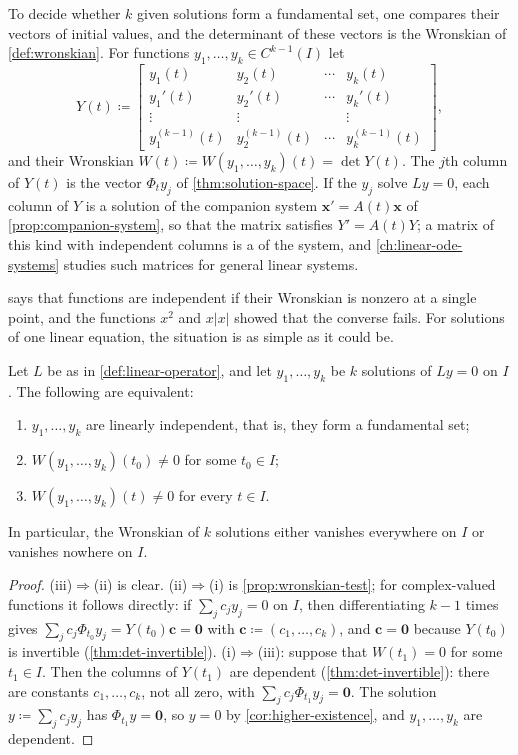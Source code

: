 To decide whether $k$ given solutions form a fundamental set, one compares their vectors of initial values, and the determinant of these vectors is the Wronskian of \cref{def:wronskian}. For functions $y_1,\ldots,y_k\in C^{k-1}(I)$ let
\begin{equation}
Y(t)\coloneqq\begin{bmatrix}y_1(t)&y_2(t)&\cdots&y_k(t)\\y_1'(t)&y_2'(t)&\cdots&y_k'(t)\\\vdots&\vdots&&\vdots\\y_1^{(k-1)}(t)&y_2^{(k-1)}(t)&\cdots&y_k^{(k-1)}(t)\end{bmatrix},
\label{eq:wronskian-matrix}
\end{equation}
and their Wronskian $W(t)\coloneqq W(y_1,\ldots,y_k)(t)=\det Y(t)$. The $j$th column of $Y(t)$ is the vector $\Phi_ty_j$ of \cref{thm:solution-space}. If the $y_j$ solve $Ly=0$, each column of $Y$ is a solution of the companion system $\mathbf x'=A(t)\mathbf x$ of \cref{prop:companion-system}, so that the matrix satisfies $Y'=A(t)Y$; a matrix of this kind with independent columns is a  of the system, and \cref{ch:linear-ode-systems} studies such matrices for general linear systems.

 says that functions are independent if their Wronskian is nonzero at a single point, and the functions $x^2$ and $x|x|$ showed that the converse fails. For solutions of one linear equation, the situation is as simple as it could be.

\begin{theorem}
\label{thm:wronskian-solutions}
Let $L$ be as in \cref{def:linear-operator}, and let $y_1,\ldots,y_k$ be $k$ solutions of $Ly=0$ on $I$. The following are equivalent:
\begin{enumerate}
\item $y_1,\ldots,y_k$ are linearly independent, that is, they form a fundamental set;
\item $W(y_1,\ldots,y_k)(t_0)\ne0$ for some $t_0\in I$;
\item $W(y_1,\ldots,y_k)(t)\ne0$ for every $t\in I$.
\end{enumerate}
In particular, the Wronskian of $k$ solutions either vanishes everywhere on $I$ or vanishes nowhere on $I$.
\end{theorem}

\begin{proof}
(iii)$\Rightarrow$(ii) is clear. (ii)$\Rightarrow$(i) is \cref{prop:wronskian-test}; for complex-valued functions it follows directly: if $\sum_jc_jy_j=0$ on $I$, then differentiating $k-1$ times gives $\sum_jc_j\Phi_{t_0}y_j=Y(t_0)\mathbf c=\mathbf 0$ with $\mathbf c\coloneqq(c_1,\ldots,c_k)$, and $\mathbf c=\mathbf 0$ because $Y(t_0)$ is invertible (\cref{thm:det-invertible}). (i)$\Rightarrow$(iii): suppose that $W(t_1)=0$ for some $t_1\in I$. Then the columns of $Y(t_1)$ are dependent (\cref{thm:det-invertible}): there are constants $c_1,\ldots,c_k$, not all zero, with $\sum_jc_j\Phi_{t_1}y_j=\mathbf 0$. The solution $y\coloneqq\sum_jc_jy_j$ has $\Phi_{t_1}y=\mathbf 0$, so $y=0$ by \cref{cor:higher-existence}, and $y_1,\ldots,y_k$ are dependent.
\end{proof}

